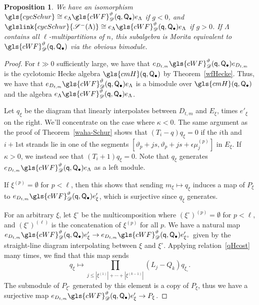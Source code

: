 \documentclass[10pt]{article}
\newtheorem{prop}[theorem]{Proposition}
\theoremstyle{definition}
\newcommand{\ck}{g}
\newcommand{\pq}{\mathsf{q}}
\newcommand{\PQ}{\mathsf{Q}}
\begin{document}
\begin{prop}\label{cqs-morita}
We have an isomorphism $\gls{cycSchur}\cong e_\Lambda \gls{cWF}^\vartheta_\mathscr{D}
 (\pq,\PQ_{\bullet})e_\Lambda $ if $\ck<0$, and $ \glslink{cycSchur}{\mathscr{S}^-(\Lambda)}\cong e_\Lambda \gls{cWF}^\vartheta_\mathscr{D}
 (\pq,\PQ_{\bullet})e_\Lambda $ if $\ck>0$. If $\Lambda$ contains all
 $\ell$-multipartitions of $n$, this subalgebra is Morita equivalent to $\gls{cWF}^\vartheta_\mathscr{D}
 (\pq,\PQ_{\bullet})$ via the obvious bimodule.
\end{prop}
\begin{proof}
 For $t\gg 0$ sufficiently large, we have that $e_{D_{t,m}}\gls{cWF}^\vartheta_\mathscr{D} (\pq,\PQ_{\bullet}) e_{D_{t,m}}$ is the cyclotomic
 Hecke algebra $\gls{cmH}(\pq,\PQ_\bullet) $ by Theorem~\ref{wfHecke}.
 Thus, we have that $e_{D_{t,m}}\gls{cWF}^\vartheta_\mathscr{D}
 (\pq,\PQ_{\bullet}) e_\Lambda $ is a bimodule over $\gls{cmH}(\pq,\PQ_\bullet)$
 and the algebra $e_\Lambda \gls{cWF}^\vartheta_\mathscr{D}
 (\pq,\PQ_{\bullet})e_\Lambda $. 


Let $q_\xi$ be the diagram that linearly
 interpolates between $D_{t,m}$ and $E_\xi$, times $e'_\xi$ on the
 right. We'll concentrate on the case where $\kappa<0$. The same argument as the proof of Theorem~\ref{waha-Schur}
 shows that $(T_i-q)q_\xi=0$ if the $i$th and $i+1$st strands lie in
 one of the segments $[
\vartheta_p+js,\vartheta_p+js+\epsilon\mu^{(p)}_j]$ in $E_\xi$. If
$\kappa>0$, we instead see that $(T_i+1)q_\xi=0$. Note
that $q_\xi$ generates $e_{D_{t,m}}\gls{cWF}^\vartheta_\mathscr{D}
 (\pq,\PQ_{\bullet}) e_\Lambda $ as a left module.

If $\xi^{(p)}=\emptyset$ for $p<\ell$, then this shows that sending
$m_\xi\mapsto q_\xi$ induces a map of $P_\xi$
to $e_{D_{t,m}}\gls{cWF}^\vartheta_\mathscr{D}
 (\pq,\PQ_{\bullet}) e'_\xi$, which is surjective since $q_{\xi}$
 generates. 

For an arbitrary $\xi$, let $\xi^\circ$ be the multicomposition where
$(\xi^\circ)^{(p)}=\emptyset$ for $p<\ell$, and $(\xi^\circ)^{(\ell)}$
is the concatenation of $\xi^{(p)}$ for all $p$. We have a natural
map $e_{D_{t,m}}\gls{cWF}^\vartheta_\mathscr{D}
 (\pq,\PQ_{\bullet}) e'_\xi\to e_{D_{t,m}}\gls{cWF}^\vartheta_\mathscr{D}
 (\pq,\PQ_{\bullet}) e'_{\xi^\circ}$ given by the straight-line
 diagram interpolating between $\xi$ and $\xi^\circ$. Applying
 relation~\eqref{qHcost} many times, we find that this map sends
 \[q_{\xi}\mapsto\prod_{j\leq|\xi^{(1)}|+\cdots +|\xi^{(k-1)}|}
 (L_j-Q_k)q_{\xi_\circ}.\] The submodule of $P_{\xi^\circ}$
 generated by this element is a copy of $P_{\xi}$, thus we have a
 surjective map $e_{D_{t,m}}\gls{cWF}^\vartheta_\mathscr{D}
 (\pq,\PQ_{\bullet}) e'_\xi\to P_{\xi}$. 



\end{proof}
\end{document}
